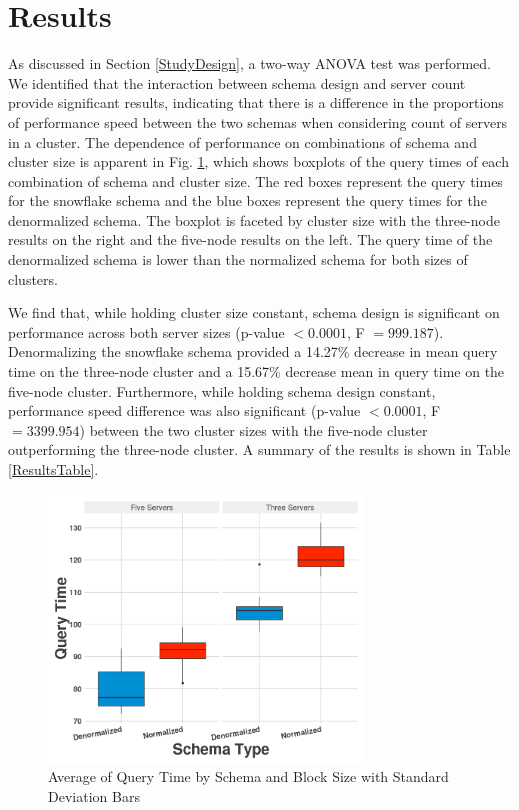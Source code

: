 \documentclass[journal]{IEEEtran}
\begin{document}
\section{Results}

As discussed in Section \ref{StudyDesign}, a two-way ANOVA test was performed.
We identified that the interaction between schema design and server count provide significant results,
indicating that there is a difference in the proportions of performance speed between the two schemas when considering count of servers in a cluster.
The dependence of performance on combinations of schema and cluster size is apparent in Fig. \ref{Results},
 which shows boxplots of the query times of each combination of schema and cluster size.
The red boxes represent the query times for the snowflake schema and
 the blue boxes represent the query times for the denormalized schema.
The boxplot is faceted by cluster size with the three-node results on the right and
 the five-node results on the left.
The query time of the denormalized schema is lower than the normalized schema for both sizes of clusters.

We find that, while holding cluster size constant,
 schema design is significant on performance across both server sizes
 (p-value $< 0.0001$, F $ = 999.187$). 
Denormalizing the snowflake schema provided a 14.27\% decrease in mean query time on
 the three-node cluster and a 15.67\% decrease mean in query time on the five-node cluster.
Furthermore, while holding schema design constant, 
 performance speed difference was also significant 
 (p-value $< 0.0001$, F $= 3399.954$) 
 between the two cluster sizes with the five-node cluster outperforming
 the three-node cluster. 
A summary of the results is shown in Table \ref{ResultsTable}.

\begin{figure}
	\centering
	\includegraphics[width=3.3in]{Rplot.png}
	\caption{Average of Query Time by Schema and Block Size with Standard Deviation Bars}
	\label{Results}
\end{figure}
\end{document}
